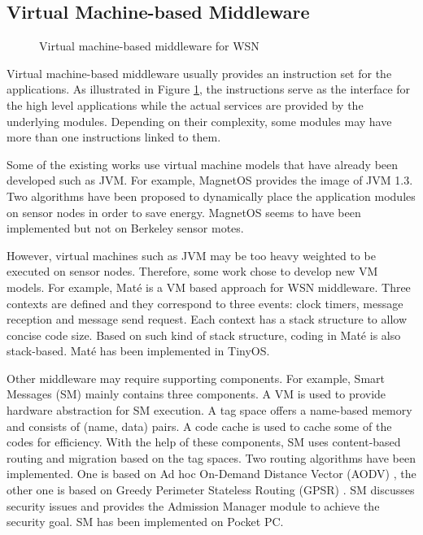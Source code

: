 \subsection{Virtual Machine-based Middleware}

\begin{figure}
\centering
{}
\caption{Virtual machine-based middleware for WSN}
\label{fig:wsn-middleware-vm}
\end{figure}

Virtual machine-based middleware usually provides an instruction set for the applications. As illustrated in Figure \ref{fig:wsn-middleware-vm}, the instructions serve as the interface for the high level applications while the actual services are provided by the underlying modules. Depending on their complexity, some modules may have more than one instructions linked to them.

Some of the existing works use virtual machine models that have already been developed such as JVM. For example, MagnetOS \cite{magnetos} provides the image of JVM 1.3. Two algorithms have been proposed to dynamically place the application modules on sensor nodes in order to save energy. MagnetOS seems to have been implemented but not on Berkeley sensor motes.

However, virtual machines such as JVM may be too heavy weighted to be executed on sensor nodes. Therefore, some work chose to develop new VM models. For example, Mat\'{e} \cite{mate} is a VM based approach for WSN middleware. Three contexts are defined and they correspond to three events: clock timers, message reception and message send request. Each context has a stack structure to allow concise code size. Based on such kind of stack structure, coding in Mat\'{e} is also stack-based. Mat\'{e} has been implemented in TinyOS.

Other middleware may require supporting components. For example, Smart Messages (SM) \cite{smartmessage} mainly contains three components. A VM is used to provide hardware abstraction for SM execution. A tag space offers a name-based memory and consists of (name, data) pairs. A code cache is used to cache some of the codes for efficiency. With the help of these components, SM uses content-based routing and migration based on the tag spaces. Two routing algorithms have been implemented. One is based on Ad hoc On-Demand Distance Vector (AODV) \cite{aodv}, the other one is based on Greedy Perimeter Stateless Routing (GPSR) \cite{gpsr}. SM discusses security issues and provides the Admission Manager module to achieve the security goal. SM has been implemented on Pocket PC.

